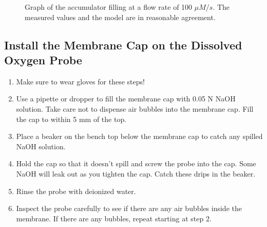 \documentclass[letterpaper,10pt,english]{sphinxmanual}
\let\sphinxpxdimen\pdfpxdimen\else\newdimen\sphinxpxdimen
\begin{document}
\begin{figure}[htbp]
\centering
\capstart

\noindent\sphinxincludegraphics[width=600\sphinxpxdimen]{{Accumulator_fill}.png}
\caption{Graph of the accumulator filling at a flow rate of 100 \(\mu M/s\). The measured values and the model are in reasonable agreement.}\label{\detokenize{Gas_Transfer/Gas_Transfer:id7}}\label{\detokenize{Gas_Transfer/Gas_Transfer:figure-accumulator-fill}}\end{figure}


\subsection{Install the Membrane Cap on the Dissolved Oxygen Probe}
\label{\detokenize{Gas_Transfer/Gas_Transfer:install-the-membrane-cap-on-the-dissolved-oxygen-probe}}\begin{enumerate}
\item {} 
Make sure to wear gloves for these steps!

\item {} 
Use a pipette or dropper to fill the membrane cap with 0.05 N NaOH solution. Take care not to dispense air bubbles into the membrane cap. Fill the cap to within 5 mm of the top.

\item {} 
Place a beaker on the bench top below the membrane cap to catch any spilled NaOH solution.

\item {} 
Hold the cap so that it doesn’t spill and screw the probe into the cap. Some NaOH will leak out as you tighten the cap. Catch these drips in the beaker.

\item {} 
Rinse the probe with deionized water.

\item {} 
Inspect the probe carefully to see if there are any air bubbles inside the membrane. If there are any bubbles, repeat starting at step 2.

\end{enumerate}
\end{document}
